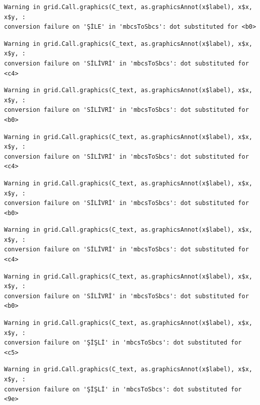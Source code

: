 \documentclass[
  11pt,
  a4paper,
  DIV=11,
  numbers=noendperiod]{scrartcl}
\begin{document}
\begin{verbatim}
Warning in grid.Call.graphics(C_text, as.graphicsAnnot(x$label), x$x, x$y, :
conversion failure on 'ŞİLE' in 'mbcsToSbcs': dot substituted for <b0>
\end{verbatim}

\begin{verbatim}
Warning in grid.Call.graphics(C_text, as.graphicsAnnot(x$label), x$x, x$y, :
conversion failure on 'SİLİVRİ' in 'mbcsToSbcs': dot substituted for <c4>
\end{verbatim}

\begin{verbatim}
Warning in grid.Call.graphics(C_text, as.graphicsAnnot(x$label), x$x, x$y, :
conversion failure on 'SİLİVRİ' in 'mbcsToSbcs': dot substituted for <b0>
\end{verbatim}

\begin{verbatim}
Warning in grid.Call.graphics(C_text, as.graphicsAnnot(x$label), x$x, x$y, :
conversion failure on 'SİLİVRİ' in 'mbcsToSbcs': dot substituted for <c4>
\end{verbatim}

\begin{verbatim}
Warning in grid.Call.graphics(C_text, as.graphicsAnnot(x$label), x$x, x$y, :
conversion failure on 'SİLİVRİ' in 'mbcsToSbcs': dot substituted for <b0>
\end{verbatim}

\begin{verbatim}
Warning in grid.Call.graphics(C_text, as.graphicsAnnot(x$label), x$x, x$y, :
conversion failure on 'SİLİVRİ' in 'mbcsToSbcs': dot substituted for <c4>
\end{verbatim}

\begin{verbatim}
Warning in grid.Call.graphics(C_text, as.graphicsAnnot(x$label), x$x, x$y, :
conversion failure on 'SİLİVRİ' in 'mbcsToSbcs': dot substituted for <b0>
\end{verbatim}

\begin{verbatim}
Warning in grid.Call.graphics(C_text, as.graphicsAnnot(x$label), x$x, x$y, :
conversion failure on 'ŞİŞLİ' in 'mbcsToSbcs': dot substituted for <c5>
\end{verbatim}

\begin{verbatim}
Warning in grid.Call.graphics(C_text, as.graphicsAnnot(x$label), x$x, x$y, :
conversion failure on 'ŞİŞLİ' in 'mbcsToSbcs': dot substituted for <9e>
\end{verbatim}
\end{document}
